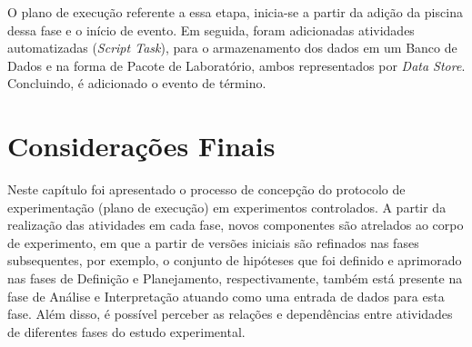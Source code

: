 O plano de execução referente a essa etapa, inicia-se a partir da adição da piscina dessa fase e o início de evento. Em seguida, foram adicionadas atividades automatizadas (\textit{Script Task}), para o armazenamento dos dados em um Banco de Dados e na forma de Pacote de Laboratório, ambos representados por \textit{Data Store}. Concluindo, é adicionado o evento de término.

\section{Considerações Finais}
Neste capítulo foi apresentado o processo de concepção do protocolo de experimentação (plano de execução) em experimentos controlados. A partir da realização das atividades em cada fase, novos componentes são atrelados ao corpo de experimento, em que a partir de versões iniciais são refinados nas fases subsequentes, por exemplo, o conjunto de hipóteses que foi definido e aprimorado nas fases de Definição e Planejamento, respectivamente, também está presente na fase de Análise e Interpretação atuando como uma entrada de dados para esta fase.
Além disso, é possível perceber as relações e dependências entre atividades de diferentes fases do estudo experimental.